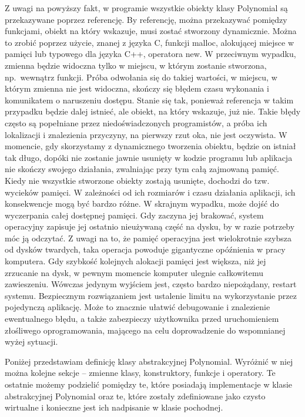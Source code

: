 Z uwagi na powyższy fakt, w programie wszystkie obiekty klasy Polynomial są przekazywane poprzez referencję. By referencję, można przekazywać pomiędzy funkcjami, obiekt na który wskazuje, musi zostać stworzony dynamicznie. Można to zrobić poprzez użycie, znanej z języka C, funkcji malloc, alokującej miejsce w pamięci lub typowego dla języka C++, operatora new. W przeciwnym wypadku, zmienna będzie widoczna tylko w miejscu, w którym zostanie stworzona, np.\ wewnątrz funkcji. Próba odwołania się do takiej wartości, w miejscu, w którym zmienna nie jest widoczna, skończy się błędem czasu wykonania i komunikatem o naruszeniu dostępu. Stanie się tak, ponieważ referencja w takim przypadku będzie dalej istnieć, ale obiekt, na który wskazuje, już nie. Takie błędy często są popełniane przez niedoświadczonych programistów, a próba ich lokalizacji i znalezienia przyczyny, na pierwszy rzut oka, nie jest oczywista. W momencie, gdy skorzystamy z dynamicznego tworzenia obiektu, będzie on istniał tak długo, dopóki nie zostanie jawnie usunięty w kodzie programu lub aplikacja nie skończy swojego działania, zwalniając przy tym całą zajmowaną pamięć. Kiedy nie wszystkie stworzone obiekty zostają usunięte, dochodzi do tzw. wycieków pamięci. W zależności od ich rozmiarów i czasu działania aplikacji, ich konsekwencje mogą być bardzo różne. W skrajnym wypadku, może dojść do wyczerpania całej dostępnej pamięci. Gdy zaczyna jej brakować, system operacyjny zapisuje jej ostatnio nieużywaną część na dysku, by w razie potrzeby móc ją odczytać. Z uwagi na to, że pamięć operacyjna jest wielokrotnie szybsza od dysków twardych, taka operacja powoduje gigantyczne opóźnienia w pracy komputera. Gdy szybkość kolejnych alokacji pamięci jest większa, niż jej zrzucanie na dysk, w pewnym momencie komputer ulegnie całkowitemu zawieszeniu. Wówczas jedynym wyjściem jest, często bardzo niepożądany, restart systemu. Bezpiecznym rozwiązaniem jest ustalenie limitu na wykorzystanie przez pojedynczą aplikację. Może to znacznie ułatwić debugowanie i znalezienie ewentualnego błędu, a także zabezpieczy użytkownika przed uruchomieniem złośliwego oprogramowania, mającego na celu doprowadzenie do wspomnianej wyżej sytuacji.

Poniżej przedstawiam definicję klasy abstrakcyjnej Polynomial. Wyróżnić w niej można kolejne sekcje -- zmienne klasy, konstruktory, funkcje i operatory. Te ostatnie możemy podzielić pomiędzy te, które posiadają implementacje w klasie abstrakcyjnej Polynomial oraz te, które zostały zdefiniowane jako czysto wirtualne i konieczne jest ich nadpisanie w klasie pochodnej.

